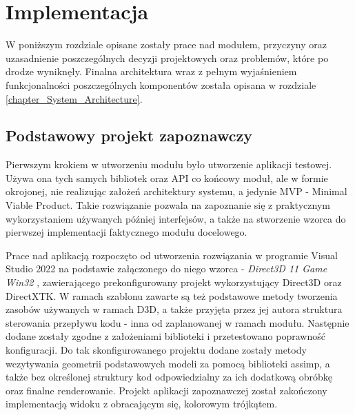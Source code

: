 \chapter{Implementacja}
W poniższym rozdziale opisane zostały prace nad modułem, przyczyny oraz uzasadnienie poszczególnych decyzji projektowych oraz problemów, które po drodze wyniknęły. Finalna architektura wraz z pełnym wyjaśnieniem funkcjonalności poszczególnych komponentów została opisana w rozdziale \ref{chapter_System_Architecture}.

\section{Podstawowy projekt zapoznawczy}
Pierwszym krokiem w utworzeniu modułu było utworzenie aplikacji testowej. Używa ona tych samych bibliotek oraz API co końcowy moduł, ale w formie okrojonej, nie realizując założeń architektury systemu, a jedynie MVP - Minimal Viable Product. Takie rozwiązanie pozwala na zapoznanie się z praktycznym wykorzystaniem używanych później interfejsów, a także na stworzenie wzorca do pierwszej implementacji faktycznego modułu docelowego.

Prace nad aplikacją rozpoczęto od utworzenia rozwiązania w programie Visual Studio 2022 na podstawie załączonego do niego wzorca - \textit{Direct3D 11 Game Win32} \cite{GitHub:walbourn:directx-vs-templates}, zawierającego prekonfigurowany projekt wykorzystujący Direct3D oraz DirectXTK. W ramach szablonu zawarte są też podstawowe metody tworzenia zasobów używanych w ramach D3D, a także przyjęta przez jej autora struktura sterowania przepływu kodu - inna od zaplanowanej w ramach modułu. Następnie dodane zostały zgodne z założeniami biblioteki i przetestowano poprawność konfiguracji. Do tak skonfigurowanego projektu dodane zostały metody wczytywania geometrii podstawowych modeli za pomocą biblioteki assimp, a także bez określonej struktury kod odpowiedzialny za ich dodatkową obróbkę oraz finalne renderowanie.  Projekt aplikacji zapoznawczej został zakończony implementacją widoku z obracającym się, kolorowym trójkątem. 



